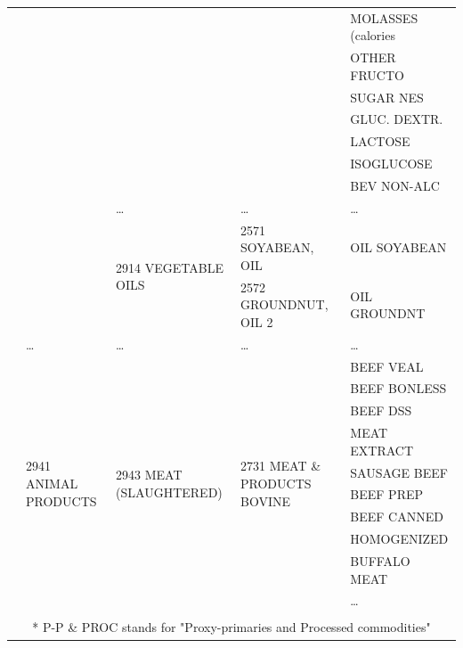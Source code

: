 \documentclass[]{article}
\begin{document}
\begin{table}[ht]
{\begin{tabular}{l|l|l|l|l}
&  &  &  & MOLASSES (calories \\ 
&  &  &  & OTHER FRUCTO \\ 
&  &  &  & SUGAR NES \\ 
&  &  &  & GLUC. DEXTR. \\ 
&  &  &  & LACTOSE \\ 
&  &  &  & ISOGLUCOSE \\ 
&  &  &   & BEV NON-ALC \\ 
&  & … & … & … \\
\cline{3-5}
&  & \multirow{2}{*}{2914 VEGETABLE OILS} & 2571 SOYABEAN, OIL & OIL SOYABEAN \\ 
&  &  & 2572 GROUNDNUT, OIL 2 & OIL GROUNDNT \\ 
& … & … & … & … \\
\cline{2-5}
& \multirow{10}{*}{2941  ANIMAL PRODUCTS}  & \multirow{10}{*}{2943 MEAT (SLAUGHTERED)}  & \multirow{10}{*}{2731 MEAT \& PRODUCTS BOVINE}  & BEEF VEAL \\ 
&  &   &  & BEEF BONLESS \\ 
&  &  &  & BEEF DSS \\ 
&  &  &  & MEAT EXTRACT \\ 
&  &  &  & SAUSAGE BEEF \\ 
&  &  &  & BEEF PREP \\ 
&  &  &  & BEEF CANNED \\ 
&  &  &  & HOMOGENIZED \\ 
&  &  &  & BUFFALO MEAT \\ 
& … & … & … & … \\
\bottomrule
\\
\multicolumn{5}{c|}{* P-P \& PROC stands for "Proxy-primaries and Processed commodities"}
\end{tabular}
}
\end{table}
\end{document}
